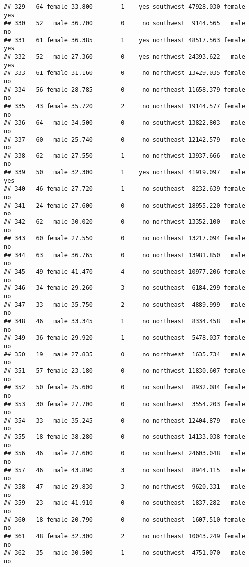 \documentclass[
]{article}
\begin{document}
\begin{verbatim}
## 329   64 female 33.800        1    yes southwest 47928.030 female      yes
## 330   52   male 36.700        0     no southwest  9144.565   male       no
## 331   61 female 36.385        1    yes northeast 48517.563 female      yes
## 332   52   male 27.360        0    yes northwest 24393.622   male      yes
## 333   61 female 31.160        0     no northwest 13429.035 female       no
## 334   56 female 28.785        0     no northeast 11658.379 female       no
## 335   43 female 35.720        2     no northeast 19144.577 female       no
## 336   64   male 34.500        0     no southwest 13822.803   male       no
## 337   60   male 25.740        0     no southeast 12142.579   male       no
## 338   62   male 27.550        1     no northwest 13937.666   male       no
## 339   50   male 32.300        1    yes northeast 41919.097   male      yes
## 340   46 female 27.720        1     no southeast  8232.639 female       no
## 341   24 female 27.600        0     no southwest 18955.220 female       no
## 342   62   male 30.020        0     no northwest 13352.100   male       no
## 343   60 female 27.550        0     no northeast 13217.094 female       no
## 344   63   male 36.765        0     no northeast 13981.850   male       no
## 345   49 female 41.470        4     no southeast 10977.206 female       no
## 346   34 female 29.260        3     no southeast  6184.299 female       no
## 347   33   male 35.750        2     no southeast  4889.999   male       no
## 348   46   male 33.345        1     no northeast  8334.458   male       no
## 349   36 female 29.920        1     no southeast  5478.037 female       no
## 350   19   male 27.835        0     no northwest  1635.734   male       no
## 351   57 female 23.180        0     no northwest 11830.607 female       no
## 352   50 female 25.600        0     no southwest  8932.084 female       no
## 353   30 female 27.700        0     no southwest  3554.203 female       no
## 354   33   male 35.245        0     no northeast 12404.879   male       no
## 355   18 female 38.280        0     no southeast 14133.038 female       no
## 356   46   male 27.600        0     no southwest 24603.048   male       no
## 357   46   male 43.890        3     no southeast  8944.115   male       no
## 358   47   male 29.830        3     no northwest  9620.331   male       no
## 359   23   male 41.910        0     no southeast  1837.282   male       no
## 360   18 female 20.790        0     no southeast  1607.510 female       no
## 361   48 female 32.300        2     no northeast 10043.249 female       no
## 362   35   male 30.500        1     no southwest  4751.070   male       no

\end{verbatim}
\end{document}
